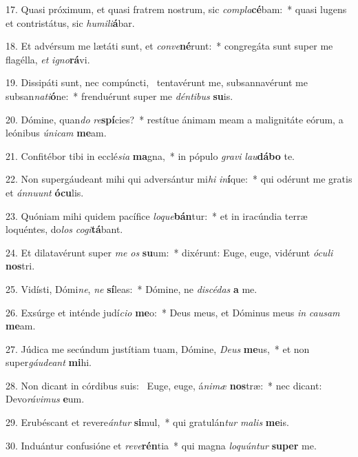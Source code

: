 17. Quasi próximum, et quasi fratrem nostrum, sic \textit{com}\textit{pla}\textbf{cé}bam:~*  quasi lugens et contristátus, sic \textit{hu}\textit{mi}\textit{li}\textbf{á}bar.\

18. Et advérsum me lætáti sunt, et \textit{con}\textit{ve}\textbf{né}runt:~*  congregáta sunt super me flagélla, \textit{et} \textit{i}\textit{gno}\textbf{rá}vi.\

19. Dissipáti sunt, nec compúncti, \dag\  tentavérunt me, subsannavérunt me subsan\textit{na}\textit{ti}\textbf{ó}ne:~*  frenduérunt super me \textit{dén}\textit{ti}\textit{bus} \textbf{su}is.\

20. Dómine, quan\textit{do} \textit{re}\textbf{spí}cies?~*  restítue ánimam meam a malignitáte eórum, a leónibus \textit{ú}\textit{ni}\textit{cam} \textbf{me}am.\

21. Confitébor tibi in ecclé\textit{si}\textit{a} \textbf{ma}gna,~*  in pópulo \textit{gra}\textit{vi} \textit{lau}\textbf{dá}\textbf{bo} te.\

22. Non supergáudeant mihi qui adversántur mi\textit{hi} \textit{in}\textbf{í}que:~*  qui odérunt me gratis et \textit{án}\textit{nu}\textit{unt} \textbf{ó}\textbf{cu}lis.\

23. Quóniam mihi quidem pacífice \textit{lo}\textit{que}\textbf{bán}tur:~*  et in iracúndia terræ loquéntes, do\textit{los} \textit{co}\textit{gi}\textbf{tá}bant.\

24. Et dilatavérunt super \textit{me} \textit{os} \textbf{su}um:~*  dixérunt: Euge, euge, vidérunt \textit{ó}\textit{cu}\textit{li} \textbf{nos}tri.\

25. Vidísti, Dómi\textit{ne}, \textit{ne} \textbf{sí}leas:~*  Dómine, ne \textit{di}\textit{scé}\textit{das} \textbf{a} me.\

26. Exsúrge et inténde judí\textit{ci}\textit{o} \textbf{me}o:~*  Deus meus, et Dóminus meus \textit{in} \textit{cau}\textit{sam} \textbf{me}am.\

27. Júdica me secúndum justítiam tuam, Dómine, \textit{De}\textit{us} \textbf{me}us,~*  et non super\textit{gáu}\textit{de}\textit{ant} \textbf{mi}hi.\

28. Non dicant in córdibus suis: \dag\  Euge, euge, á\textit{ni}\textit{mæ} \textbf{nos}træ:~*  nec dicant: Devo\textit{rá}\textit{vi}\textit{mus} \textbf{e}um.\

29. Erubéscant et revere\textit{án}\textit{tur} \textbf{si}mul,~*  qui gratulán\textit{tur} \textit{ma}\textit{lis} \textbf{me}is.\

30. Induántur confusióne et \textit{re}\textit{ve}\textbf{rén}tia~*  qui magna \textit{lo}\textit{quún}\textit{tur} \textbf{su}\textbf{per} me.\

